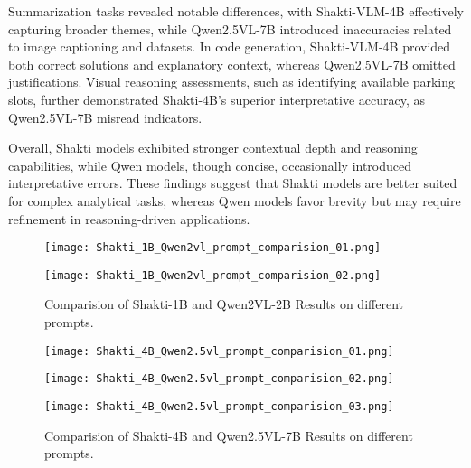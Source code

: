 \documentclass{article}
\begin{document}
Summarization tasks revealed notable differences, with Shakti-VLM-4B effectively capturing broader themes, while Qwen2.5VL-7B\cite{bai2025qwen25vltechnicalreport} introduced inaccuracies related to image captioning and datasets. In code generation, Shakti-VLM-4B provided both correct solutions and explanatory context, whereas Qwen2.5VL-7B omitted justifications. Visual reasoning assessments, such as identifying available parking slots, further demonstrated Shakti-4B’s superior interpretative accuracy, as Qwen2.5VL-7B misread indicators.

Overall, Shakti models exhibited stronger contextual depth and reasoning capabilities, while Qwen models, though concise, occasionally introduced interpretative errors. These findings suggest that Shakti models are better suited for complex analytical tasks, whereas Qwen models favor brevity but may require refinement in reasoning-driven applications.


\begin{figure}[h]
    \centering
    \texttt{[image: Shakti\_1B\_Qwen2vl\_prompt\_comparision\_01.png]}
\end{figure}
\begin{figure}[h]
    \centering
    \texttt{[image: Shakti\_1B\_Qwen2vl\_prompt\_comparision\_02.png]}
    \caption{Comparision of Shakti-1B and Qwen2VL-2B Results on different prompts.}
    \label{fig:1B-prompt}
\end{figure}



\begin{figure}[h]
    \centering
    \texttt{[image: Shakti\_4B\_Qwen2.5vl\_prompt\_comparision\_01.png]}
\end{figure}
\begin{figure}[h]
    \centering
    \texttt{[image: Shakti\_4B\_Qwen2.5vl\_prompt\_comparision\_02.png]}
\end{figure}
\begin{figure}[h]
    \centering
    \texttt{[image: Shakti\_4B\_Qwen2.5vl\_prompt\_comparision\_03.png]}
    \caption{Comparision of Shakti-4B and Qwen2.5VL-7B Results on different prompts.}
    \label{fig:4B-prompt}
\end{figure}
\end{document}
